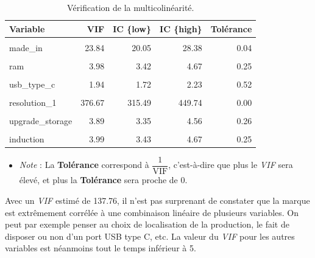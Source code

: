 \documentclass[
  12pt,
]{report}
\providecommand{\tightlist}{%
  \setlength{\itemsep}{0pt}\setlength{\parskip}{0pt}}\usepackage{longtable,booktabs,array}
\begin{document}
\begin{table}[!h]
\centering
\caption{\label{tab:collinearity_level}Vérification de la multicolinéarité.}
\centering
\begin{tabular}[t]{lrrrr}
\toprule
\textbf{Variable} & \textbf{VIF} & \textbf{IC \{low\}} & \textbf{IC \{high\}} & \textbf{Tolérance}\\
\midrule
\cellcolor{gray!10}{brand} & \cellcolor{gray!10}{271.12} & \cellcolor{gray!10}{227.12} & \cellcolor{gray!10}{323.70} & \cellcolor{gray!10}{0.00}\\
made\_in & 23.84 & 20.05 & 28.38 & 0.04\\
\cellcolor{gray!10}{storage} & \cellcolor{gray!10}{2.03} & \cellcolor{gray!10}{1.79} & \cellcolor{gray!10}{2.34} & \cellcolor{gray!10}{0.49}\\
ram & 3.98 & 3.42 & 4.67 & 0.25\\
\cellcolor{gray!10}{screen\_type} & \cellcolor{gray!10}{4.45} & \cellcolor{gray!10}{3.81} & \cellcolor{gray!10}{5.22} & \cellcolor{gray!10}{0.22}\\
\addlinespace
usb\_type\_c & 1.94 & 1.72 & 2.23 & 0.52\\
\cellcolor{gray!10}{battery} & \cellcolor{gray!10}{2.55} & \cellcolor{gray!10}{2.22} & \cellcolor{gray!10}{2.95} & \cellcolor{gray!10}{0.39}\\
resolution\_1 & 376.67 & 315.49 & 449.74 & 0.00\\
\cellcolor{gray!10}{resolution\_2} & \cellcolor{gray!10}{219.61} & \cellcolor{gray!10}{183.98} & \cellcolor{gray!10}{262.17} & \cellcolor{gray!10}{0.00}\\
upgrade\_storage & 3.89 & 3.35 & 4.56 & 0.26\\
\addlinespace
\cellcolor{gray!10}{diagonal\_pixels} & \cellcolor{gray!10}{294.05} & \cellcolor{gray!10}{246.32} & \cellcolor{gray!10}{351.08} & \cellcolor{gray!10}{0.00}\\
induction & 3.99 & 3.43 & 4.67 & 0.25\\
\bottomrule
\end{tabular}
\end{table}

\begin{itemize}
\tightlist
\item
  \emph{Note} : La \textbf{Tolérance} correspond à
  \(\dfrac{1}{\text{VIF}}\), c'est-à-dire que plus le \emph{VIF} sera
  élevé, et plus la \textbf{Tolérance} sera proche de 0.
\end{itemize}

Avec un \emph{VIF} estimé de 137.76, il n'est pas surprenant de
constater que la marque est extrêmement corrélée à une combinaison
linéaire de plusieurs variables. On peut par exemple penser au choix de
localisation de la production, le fait de disposer ou non d'un port USB
type C, etc. La valeur du \emph{VIF} pour les autres variables est
néanmoins tout le temps inférieur à 5.
\end{document}
